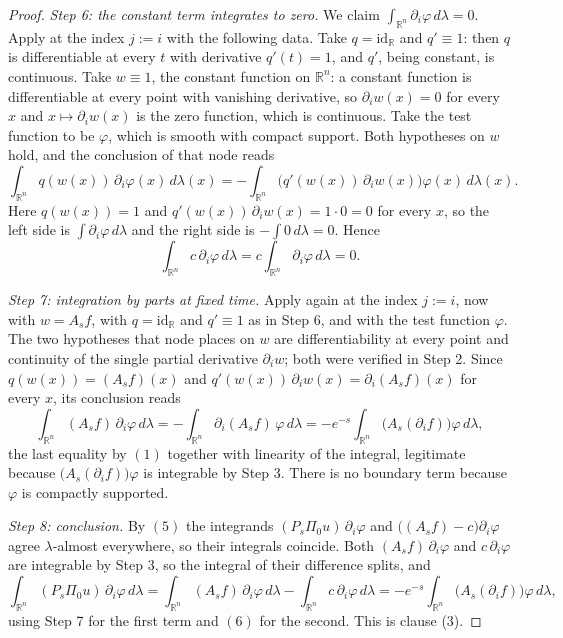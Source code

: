 \begin{proof}
\emph{Step 6: the constant term integrates to zero.}
We claim $\int_{\mathbb{R}^n}\partial_i\varphi\,d\lambda = 0$.  Apply
 at the index $j := i$ with the following data.
Take $q = \mathrm{id}_{\mathbb{R}}$ and $q' \equiv 1$: then $q$ is differentiable
at every $t$ with derivative $q'(t) = 1$, and $q'$, being constant, is
continuous.  Take $w \equiv 1$, the constant function on $\mathbb{R}^n$: a
constant function is differentiable at every point with vanishing derivative, so
$\partial_i w(x) = 0$ for every $x$ and $x \mapsto \partial_i w(x)$ is the zero
function, which is continuous.  Take the test function to be $\varphi$, which is
smooth with compact support.  Both hypotheses on $w$ hold, and the conclusion of
that node reads
\[
  \int_{\mathbb{R}^n}q(w(x))\,\partial_i\varphi(x)\,d\lambda(x)
    = -\int_{\mathbb{R}^n}
        \bigl(q'(w(x))\,\partial_iw(x)\bigr)\varphi(x)\,d\lambda(x) .
\]
Here $q(w(x)) = 1$ and $q'(w(x))\,\partial_iw(x) = 1\cdot 0 = 0$ for every $x$,
so the left side is $\int\partial_i\varphi\,d\lambda$ and the right side is
$-\int 0\,d\lambda = 0$.  Hence
\begin{equation*}
  \int_{\mathbb{R}^n}c\,\partial_i\varphi\,d\lambda
    = c\int_{\mathbb{R}^n}\partial_i\varphi\,d\lambda = 0 . \tag{6}
\end{equation*}

\emph{Step 7: integration by parts at fixed time.}
Apply  again at the index $j := i$, now with
$w = A_sf$, with $q = \mathrm{id}_{\mathbb{R}}$ and $q' \equiv 1$ as in Step 6,
and with the test function $\varphi$.  The two hypotheses that node places on $w$
are differentiability at every point and continuity of the single partial
derivative $\partial_iw$; both were verified in Step 2.  Since
$q(w(x)) = (A_sf)(x)$ and
$q'(w(x))\,\partial_iw(x) = \partial_i(A_sf)(x)$ for every $x$, its conclusion
reads
\[
  \int_{\mathbb{R}^n}(A_sf)\,\partial_i\varphi\,d\lambda
    = -\int_{\mathbb{R}^n}\partial_i(A_sf)\,\varphi\,d\lambda
    = -e^{-s}\int_{\mathbb{R}^n}\bigl(A_s(\partial_if)\bigr)\varphi\,d\lambda ,
\]
the last equality by $(1)$ together with linearity of the integral, legitimate
because $\bigl(A_s(\partial_if)\bigr)\varphi$ is integrable by Step 3.  There is
no boundary term because $\varphi$ is compactly supported.

\emph{Step 8: conclusion.}
By $(5)$ the integrands $(P_s\Pi_0u)\,\partial_i\varphi$ and
$\bigl((A_sf) - c\bigr)\partial_i\varphi$ agree $\lambda$-almost everywhere, so
their integrals coincide.  Both $(A_sf)\,\partial_i\varphi$ and
$c\,\partial_i\varphi$ are integrable by Step 3, so the integral of their
difference splits, and
\[
  \int_{\mathbb{R}^n}(P_s\Pi_0u)\,\partial_i\varphi\,d\lambda
    = \int_{\mathbb{R}^n}(A_sf)\,\partial_i\varphi\,d\lambda
      - \int_{\mathbb{R}^n}c\,\partial_i\varphi\,d\lambda
    = -e^{-s}\int_{\mathbb{R}^n}\bigl(A_s(\partial_if)\bigr)\varphi\,d\lambda ,
\]
using Step 7 for the first term and $(6)$ for the second.  This is clause (3).
\end{proof}
